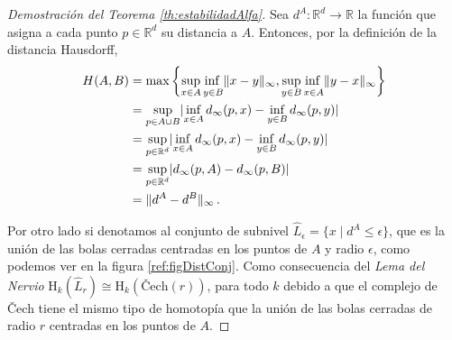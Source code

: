 \begin{proof}[Demostración del Teorema \ref{th:estabilidadAlfa}]
Sea $d^A: \mathbb{R}^d \to \mathbb{R}$ la función que asigna a cada punto $p \in \mathbb{R}^d$ su distancia a $A$. Entonces, por la definición de la distancia Hausdorff,
\begin{align*}
H(A, B)
&=\max\left\{ \adjustlimits\sup_{x\in A} \inf_{y\in B} \norm{x-y}_\infty, \adjustlimits\sup_{y\in B} \inf_{x\in A} \norm{y-x}_\infty \right\}\\
&=\sup_{p\in A \cup B}\abs{\inf_{x\in A} d_\infty(p,x) - \inf_{y\in B} d_\infty(p,y)}\\
&=\sup_{p\in \mathbb{R}^d}\abs{\inf_{x\in A} d_\infty(p,x) - \inf_{y\in B} d_\infty(p,y)}\\
&=\sup_{p\in \mathbb{R}^d}\abs{d_\infty(p, A) - d_\infty(p, B)}\\
&=\norm{d^A-d^B}_\infty\,.
\end{align*}

Por otro lado si denotamos al conjunto de subnivel $\widehat{L}_\epsilon=\{x \mid d^A \leq \epsilon\}$, que es la unión de las bolas cerradas centradas en los puntos de $A$ y radio $\epsilon$, como podemos ver en la figura \ref{ref:figDistConj}. Como consecuencia del \emph{Lema del Nervio} $\text{H}_k(\widehat{L}_r) \cong \text{H}_k(\text{\v{C}ech}(r))$, para todo $k$ debido a que el complejo de \v{C}ech tiene el mismo tipo de homotopía que la unión de las bolas cerradas de radio $r$ centradas en los puntos de $A$.


\end{proof}
